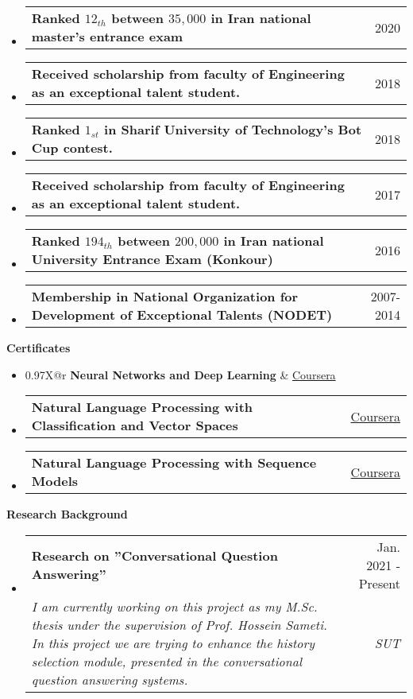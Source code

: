 \documentclass[letterpaper,12pt]{article}
\makeatletter
\def \entryspacing {-0pt}
\renewcommand{\section}[2]{\vspace{5pt}
	\colorbox{secondary}{\color{white}\raggedbottom\normalsize\textbf{{#1}{\hspace{7pt}#2}}}
}
\newcommand{\resumeEntryStart}{\begin{itemize}[leftmargin=2.5mm]}
\newcommand{\resumeEntryEnd}{\end{itemize}\vspace{\entryspacing}}
\newcommand{\resumeEntryTSDL}[4]{
	\vspace{-1pt}\item[]
	\begin{tabularx}{0.97\textwidth}{X@{\hspace{60pt}}r}
		\textbf{\color{primary}#1} & {\firabook\color{accent}\small#2} \\
		\textit{\color{accent}\small#3} & \textit{\color{accent}\small#4} \\
	\end{tabularx}\vspace{-6pt}
}
\newcommand{\resumeEntryTD}[2]{
	\vspace{-1pt}\item[]
	\begin{tabularx}{0.97\textwidth}{X@{\hspace{60pt}}r}
		\textbf{\color{primary}#1} & {\firabook\color{accent}\small#2} \\
	\end{tabularx}\vspace{-6pt}
}
\makeatother
\begin{document}
	\resumeEntryStart
	\resumeEntryTD
	{Ranked \textbf{$12_{th}$} between \textbf{$ 35,000 $} in Iran national master's entrance exam}{2020}
	\resumeEntryEnd
	
	\resumeEntryStart
	\resumeEntryTD
	{Received scholarship from faculty of Engineering as an exceptional talent student.}{2018}
	\resumeEntryEnd
	
	\resumeEntryStart
	\resumeEntryTD
	{Ranked \textbf{ $1_{st} $} in Sharif University of Technology’s Bot Cup contest.}{2018}
	\resumeEntryEnd
	
	\resumeEntryStart
	\resumeEntryTD
	{Received scholarship from faculty of Engineering as an exceptional talent student.}{2017}
	\resumeEntryEnd
	
	\resumeEntryStart
	\resumeEntryTD
	{Ranked \textbf{$ 194_{th} $} between \textbf{$ 200,000 $} in Iran national University Entrance Exam (Konkour)}{2016}
	\resumeEntryEnd
	
	\resumeEntryStart
	\resumeEntryTD
	{Membership in National Organization for Development of Exceptional Talents (NODET)}{2007-2014}
	\resumeEntryEnd
	
	
	\section{\faShirtsinbulk}{Certificates}
	
	\resumeEntryStart
	\resumeEntryTD
	{Neural Networks and Deep Learning}{\href{https://www.coursera.org/account/accomplishments/verify/YWSYWM5T2MXC?utm_source=link&utm_medium=certificate&utm_content=cert_image&utm_campaign=sharing_cta&utm_product=course}{Coursera}}
	\resumeEntryEnd
	
	\resumeEntryStart
	\resumeEntryTD
	{Natural Language Processing with Classification and Vector Spaces}{\href{https://coursera.org/share/e4928f4bf88e54e314d6b42d485ecc0f}{Coursera}}
	\resumeEntryEnd

	\resumeEntryStart
	\resumeEntryTD
	{Natural Language Processing with Sequence Models}{\href{https://coursera.org/share/b6460e3fd5fa65d841e91b671fdc41c0}{Coursera}}
	\resumeEntryEnd	
	
	
	\section{\faBook}{Research Background}
	\resumeEntryStart
	\resumeEntryTSDL
	{Research on ''Conversational Question Answering''}{Jan. 2021 - Present}
	{I am currently working on this project as my M.Sc. thesis under the supervision of Prof. Hossein Sameti. In this project we are trying to enhance the history selection module, presented in the conversational question answering systems.}{SUT}
	\resumeEntryEnd
	
\end{document}
